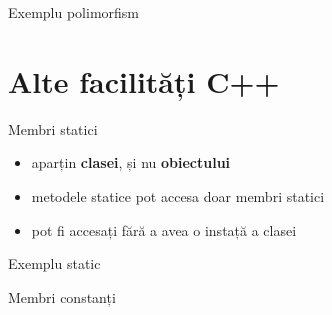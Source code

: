 \documentclass{beamer}
\begin{document}
\begin{frame}{Exemplu polimorfism}
  \footnotesize{}
\end{frame}

\section{Alte facilități C++}

\begin{frame}{Membri statici}
  \begin{itemize}
  \item aparțin \textbf{clasei}, și nu \textbf{obiectului}
  \item metodele statice pot accesa doar membri statici
  \item pot fi accesați fără a avea o instață a clasei
  \end{itemize}       
\end{frame}

\begin{frame}{Exemplu static}
	\footnotesize{}
\end{frame}

\begin{frame}{Membri constanți}
\end{frame}
\end{document}
